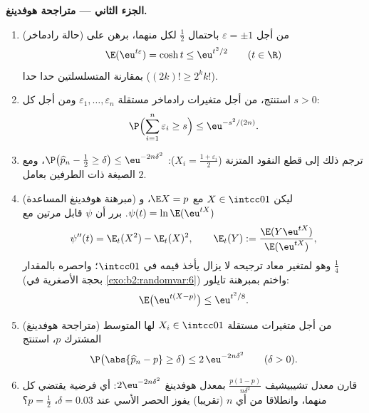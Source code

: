 \begin{problem}
\medskip
\noindent\textbf{الجزء الثاني --- متراجحة هوفدينغ.}
\begin{enumerate}[resume]
  \item (حالة رادماخر) من أجل $\varepsilon = \pm1$ باحتمال $\frac12$ لكل منهما،
        برهن على
        \[
        \E(\eu^{t\varepsilon}) = \cosh t \leq \eu^{t^2/2}
        \qquad (t \in \R)
        \]
        بمقارنة المتسلسلتين حدا حدا ($(2k)! \geq
        2^kk!$).
  \item استنتج، من أجل متغيرات رادماخر مستقلة $\varepsilon_1, \dots, \varepsilon_n$ ومن أجل كل
        $s >
        0$:
        \[
        \P\Bigl(\sum_{i=1}^n\varepsilon_i \geq s\Bigr)
        \leq \eu^{-s^2/(2n)} .
        \]
  \item ترجم ذلك إلى قطع النقود المتزنة ($X_i =
        \frac{1+\varepsilon_i}2$): $\P\bigl(\widehat p_n -
        \tfrac12 \geq \delta\bigr) \leq \eu^{-2n\delta^2}$، ومع
        الصيغة ذات الطرفين بعامل $2$.
  \item (مبرهنة هوفدينغ المساعدة) ليكن $X \in \intcc01$ مع $\E X =
        p$، و$\psi(t) = \ln\E(\eu^{tX})$.
        برر أن $\psi$ قابل  مرتين مع
        \[
        \psi''(t) = \E_t(X^2) - \E_t(X)^2, \qquad
        \E_t(Y) := \frac{\E(Y\eu^{tX})}{\E(\eu^{tX})},
        \]
        وهو \emph{} لمتغير معاد ترجيحه لا يزال يأخذ قيمه في
        $\intcc01$؛ واحصره بالمقدار $\frac14$ (بحجة الأصغرية في \cref{exo:b2:randomvar:6})
        واختم بمبرهنة تايلور:
        \[
        \E\bigl(\eu^{t(X - p)}\bigr) \leq \eu^{t^2/8} .
        \]
  \item (متراجحة هوفدينغ) من أجل متغيرات مستقلة $X_i \in
        \intcc01$ لها المتوسط
        المشترك $p$، استنتج
        \[
        \P\bigl(\abs{\widehat p_n - p} \geq \delta\bigr)
        \leq 2\,\eu^{-2n\delta^2}
        \qquad (\delta > 0).
        \]
  \item قارن معدل تشيبيشيف $\frac{p(1-p)}{n\delta^2}$ بمعدل هوفدينغ $2\eu^{-2n\delta^2}$: أي فرضية
        يقتضي كل منهما، وانطلاقا من أي $n$ (تقريبا) يفوز الحصر
        الأسي عند $\delta = 0.03$، $p =
        \frac12$؟
\end{enumerate}


\end{problem}
